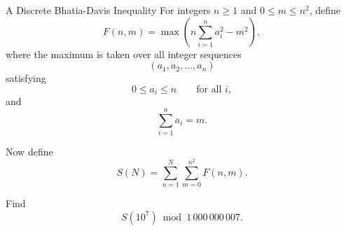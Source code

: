 \begin{problem}{A Discrete Bhatia-Davis Inequality}
    For integers \(n \ge 1\) and \(0 \le m \le n^2\), define
    \[
    F(n,m)
    =
    \max
    \left(
    n\sum_{i=1}^n a_i^2 - m^2
    \right),
    \]
    where the maximum is taken over all integer sequences
    \[
    (a_1,a_2,\dots,a_n)
    \]
    satisfying
    \[
    0 \le a_i \le n
    \qquad \text{for all } i,
    \]
    and
    \[
    \sum_{i=1}^n a_i = m.
    \]

    Now define
    \[
    S(N)
    =
    \sum_{n=1}^N
    \sum_{m=0}^{n^2}
    F(n,m).
    \]

    Find
    \[
    S(10^7)\bmod 1\,000\,000\,007.
    \]

    
\end{problem}
